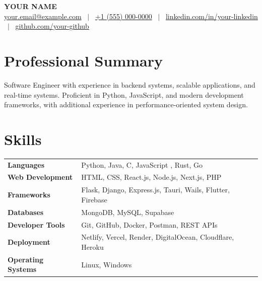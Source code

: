 \documentclass[a4paper,10pt]{article}
\begin{document}
\pagestyle{empty}

\begin{center}
{\LARGE \textbf{YOUR NAME}}\\[3pt]
\href{mailto:your.email@example.com}{your.email@example.com}
~$|$~
\href{tel:+910000085302}{+1 (555) 000-0000}
~$|$~
\href{https://www.linkedin.com/in/your-linkedin/}{linkedin.com/in/your-linkedin}
~$|$~
\href{https://github.com/your-github}{github.com/your-github}
\end{center}

\vspace{-5pt}

\section*{Professional Summary}

Software Engineer with experience in backend systems, scalable applications, and real-time systems. Proficient in Python, JavaScript, and modern development frameworks, with additional experience in performance-oriented system design.

\section*{Skills}

\renewcommand{\arraystretch}{1.05}
\begin{tabular}{@{} >{\bfseries}p{3.8cm} p{13cm} @{}}
Languages           & Python, Java, C, JavaScript , Rust, Go\\
Web Development     & HTML, CSS, React.js, Node.js, Next.js, PHP \\
Frameworks          & Flask, Django, Express.js, Tauri, Wails, Flutter, Firebase \\
Databases           & MongoDB, MySQL, Supabase \\
Developer Tools     & Git, GitHub, Docker, Postman, REST APIs \\
Deployment          & Netlify, Vercel, Render, DigitalOcean, Cloudflare, Heroku \\
Operating Systems   & Linux, Windows \\
\end{tabular}
\end{document}
